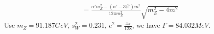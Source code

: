 \documentclass{article}
\newcommand{\gm}{\gamma^{\mu}}
\newcommand{\gn}{\gamma^{\nu}}
\newcommand{\g}{\gamma}
\renewcommand{\a}{\alpha}
\renewcommand{\b}{\beta}
\newcommand{\s}{\sigma}
\renewcommand{\G}{\Gamma}
\newcommand{\ps}{\slashed p}
\begin{document}
\begin{enumerate}[\bf 1.]
\begin{align*}
    &=\frac{\a'm_Z^2-(\a'-3\b')m^2}{12\pi m_Z^2}\sqrt{m_Z^2-4m^2}
  \end{align*}
  Use $m_Z=91.187GeV$, $s_W^2=0.231$, $e^2=\frac{4\pi}{128}$, we have $\G=84.032MeV$.
%

%

\end{enumerate}
\end{document}
